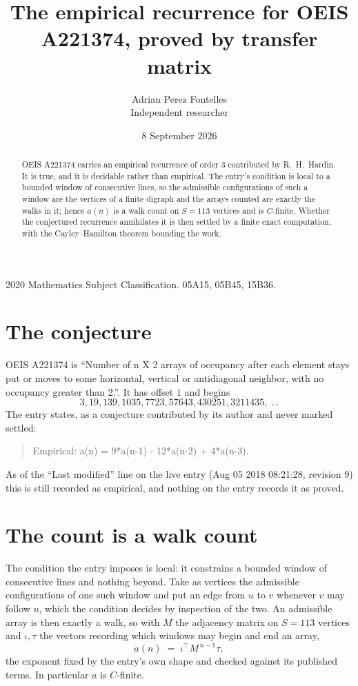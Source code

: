 \documentclass[11pt,a4paper]{article}
\title{The empirical recurrence for OEIS A221374, proved by transfer matrix}
\author{Adrian Perez Fontelles\\ \small Independent researcher}
\date{8 September 2026}
\theoremstyle{plain}
\theoremstyle{definition}
\begin{document}
\maketitle

\begin{abstract}
OEIS A221374 carries an empirical recurrence of order $3$ contributed by R.~H.~Hardin. It is
true, and it is decidable rather than empirical. The entry's condition is local to a bounded window of consecutive lines, so
the admissible configurations of such a window are the vertices of a finite digraph and the
arrays counted are exactly the walks in it; hence $a(n)$ is a walk count on $S=113$ vertices
and is $C$-finite. Whether the conjectured recurrence annihilates it is then settled by a
finite exact computation, with the Cayley--Hamilton theorem bounding the work.
\end{abstract}

\noindent\small 2020 Mathematics Subject Classification. 05A15, 05B45, 15B36.\normalsize

\section{The conjecture}

OEIS A221374 is ``Number of n X 2 arrays of occupancy after each element stays put or moves to some horizontal, vertical or antidiagonal neighbor, with no occupancy greater than 2.''. It has offset $1$ and begins
\[
3, 19, 139, 1035, 7723, 57643, 430251, 3211435,\ \dots
\]
The entry states, as a conjecture contributed by its author and never marked settled:
\begin{quote}
Empirical: a(n) = 9*a(n-1) - 12*a(n-2) + 4*a(n-3).
\end{quote}
As of the ``Last modified'' line on the live entry (Aug 05 2018 08:21:28, revision 9) this is still
recorded as empirical, and nothing on the entry records it as proved.

\section{The count is a walk count}

The condition the entry imposes is local: it constrains a bounded window of consecutive lines and nothing beyond. Take as
vertices the admissible configurations of one such window and put an edge from $u$ to $v$
whenever $v$ may follow $u$, which the condition decides by inspection of the two. An
admissible array is then exactly a walk, so with $M$ the adjacency matrix on $S=113$ vertices
and $\iota,\tau$ the vectors recording which windows may begin and end an array,
\[
a(n)\;=\;\iota^{\!\top}M^{\,n-1}\tau ,
\]
the exponent fixed by the entry's own shape and checked against its published terms. In
particular $a$ is $C$-finite.
\end{document}
